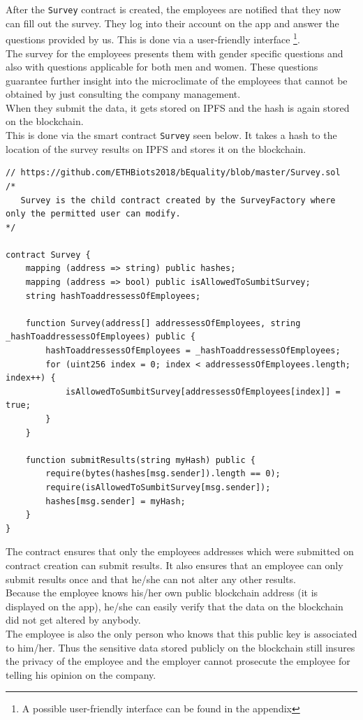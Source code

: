 \documentclass[portrait,a4paper]{article}
\begin{document}
			After the \texttt{Survey} contract is created, the employees are notified that they now can 
			fill out the survey. They log into their account on the app and answer the questions provided by us. 
			This is done via a user-friendly interface \footnote{A possible user-friendly interface can be found
			in the appendix}.\\
			The survey for the employees presents them with gender specific questions and also with questions 
			applicable for both men and women. These questions guarantee further insight into the microclimate 
			of the employees that cannot be obtained by just consulting the company management.\\
			When they submit the data, it gets stored on IPFS and the hash is again stored on the blockchain.\\
			This is done via the smart contract \texttt{Survey} seen below. It takes a hash to the location of the 
			survey results on IPFS and stores it on the blockchain.\\[-4pt]
			\begin{lstlisting}
// https://github.com/ETHBiots2018/bEquality/blob/master/Survey.sol
/*
   Survey is the child contract created by the SurveyFactory where only the permitted user can modify.
*/

contract Survey {
    mapping (address => string) public hashes;
    mapping (address => bool) public isAllowedToSumbitSurvey;
    string hashToaddressessOfEmployees;

    function Survey(address[] addressessOfEmployees, string _hashToaddressessOfEmployees) public {
        hashToaddressessOfEmployees = _hashToaddressessOfEmployees;
        for (uint256 index = 0; index < addressessOfEmployees.length; index++) {
            isAllowedToSumbitSurvey[addressessOfEmployees[index]] = true;
        }
    }

    function submitResults(string myHash) public {
        require(bytes(hashes[msg.sender]).length == 0);
        require(isAllowedToSumbitSurvey[msg.sender]);
        hashes[msg.sender] = myHash;
    }
}
			\end{lstlisting}
			The contract ensures that only the employees addresses which were submitted on contract creation 
			can submit results. It also ensures that an employee can only submit results once and that 
			he/she can not alter any other results.\\
			Because the employee knows his/her own public blockchain address (it is displayed on the app), 
			he/she can easily verify that the data on the blockchain did not get altered by anybody.\\
			The employee is also the only person who knows that this public key is associated to him/her. 
			Thus the sensitive data stored publicly on the blockchain still insures the privacy of the employee 
			and the employer cannot prosecute the employee for telling his opinion on the company.\\
\end{document}
